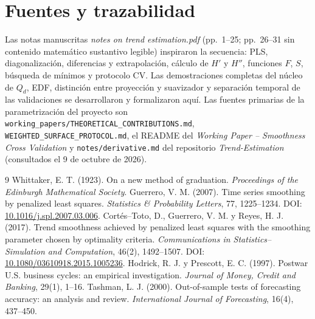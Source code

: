 \documentclass[11pt,letterpaper,parskip=half,headings=small]{scrartcl}
\theoremstyle{definition}\newtheorem{definicion}[proposicion]{Definición}
\theoremstyle{remark}\newtheorem{observacion}[proposicion]{Observación}
\begin{document}
\section*{Fuentes y trazabilidad}
Las notas manuscritas \emph{notes on trend estimation.pdf} (pp.~1--25; pp.~26--31 sin contenido matemático sustantivo legible) inspiraron la secuencia: PLS, diagonalización, diferencias y extrapolación, cálculo de $H'$ y $H''$, funciones $F$, $S$, búsqueda de mínimos y protocolo CV. Las demostraciones completas del núcleo de $Q_d$, EDF, distinción entre proyección y suavizador y separación temporal de las validaciones se desarrollaron y formalizaron aquí. Las fuentes primarias de la parametrización del proyecto son \texttt{working\_papers/THEORETICAL\_CONTRIBUTIONS.md}, \texttt{WEIGHTED\_SURFACE\_PROTOCOL.md}, el README del \textit{Working Paper -- Smoothness Cross Validation} y \texttt{notes/derivative.md} del repositorio \textit{Trend-Estimation} (consultados el 9 de octubre de 2026).

\begin{thebibliography}{9}
 Whittaker, E. T. (1923). On a new method of graduation. \emph{Proceedings of the Edinburgh Mathematical Society}.
 Guerrero, V. M. (2007). Time series smoothing by penalized least squares. \emph{Statistics \& Probability Letters}, 77, 1225--1234. DOI: \href{https://doi.org/10.1016/j.spl.2007.03.006}{10.1016/j.spl.2007.03.006}.
 Cortés--Toto, D., Guerrero, V. M. y Reyes, H. J. (2017). Trend smoothness achieved by penalized least squares with the smoothing parameter chosen by optimality criteria. \emph{Communications in Statistics--Simulation and Computation}, 46(2), 1492--1507. DOI: \href{https://doi.org/10.1080/03610918.2015.1005236}{10.1080/03610918.2015.1005236}.
 Hodrick, R. J. y Prescott, E. C. (1997). Postwar U.S. business cycles: an empirical investigation. \emph{Journal of Money, Credit and Banking}, 29(1), 1--16.
 Tashman, L. J. (2000). Out-of-sample tests of forecasting accuracy: an analysis and review. \emph{International Journal of Forecasting}, 16(4), 437--450.
\end{thebibliography}
\end{document}
